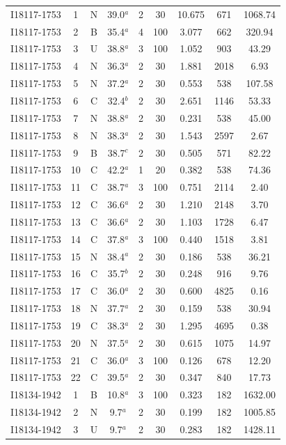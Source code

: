 \begin{table}
\begin{tabular}{ccccccccc}
I18117-1753 & 1 & N & 39.0$^{a}$ & 2 & 30 & 10.675 & 671 & 1068.74 \\
I18117-1753 & 2 & B & 35.4$^{a}$ & 4 & 100 & 3.077 & 662 & 320.94 \\
I18117-1753 & 3 & U & 38.8$^{a}$ & 3 & 100 & 1.052 & 903 & 43.29 \\
I18117-1753 & 4 & N & 36.3$^{a}$ & 2 & 30 & 1.881 & 2018 & 6.93 \\
I18117-1753 & 5 & N & 37.2$^{a}$ & 2 & 30 & 0.553 & 538 & 107.58 \\
I18117-1753 & 6 & C & 32.4$^{b}$ & 2 & 30 & 2.651 & 1146 & 53.33 \\
I18117-1753 & 7 & N & 38.8$^{a}$ & 2 & 30 & 0.231 & 538 & 45.00 \\
I18117-1753 & 8 & N & 38.3$^{a}$ & 2 & 30 & 1.543 & 2597 & 2.67 \\
I18117-1753 & 9 & B & 38.7$^{c}$ & 2 & 30 & 0.505 & 571 & 82.22 \\
I18117-1753 & 10 & C & 42.2$^{a}$ & 1 & 20 & 0.382 & 538 & 74.36 \\
I18117-1753 & 11 & C & 38.7$^{a}$ & 3 & 100 & 0.751 & 2114 & 2.40 \\
I18117-1753 & 12 & C & 36.6$^{a}$ & 2 & 30 & 1.210 & 2148 & 3.70 \\
I18117-1753 & 13 & C & 36.6$^{a}$ & 2 & 30 & 1.103 & 1728 & 6.47 \\
I18117-1753 & 14 & C & 37.8$^{a}$ & 3 & 100 & 0.440 & 1518 & 3.81 \\
I18117-1753 & 15 & N & 38.4$^{a}$ & 2 & 30 & 0.186 & 538 & 36.21 \\
I18117-1753 & 16 & C & 35.7$^{b}$ & 2 & 30 & 0.248 & 916 & 9.76 \\
I18117-1753 & 17 & C & 36.0$^{a}$ & 2 & 30 & 0.600 & 4825 & 0.16 \\
I18117-1753 & 18 & N & 37.7$^{a}$ & 2 & 30 & 0.159 & 538 & 30.94 \\
I18117-1753 & 19 & C & 38.3$^{a}$ & 2 & 30 & 1.295 & 4695 & 0.38 \\
I18117-1753 & 20 & N & 37.5$^{a}$ & 2 & 30 & 0.615 & 1075 & 14.97 \\
I18117-1753 & 21 & C & 36.0$^{a}$ & 3 & 100 & 0.126 & 678 & 12.20 \\
I18117-1753 & 22 & C & 39.5$^{a}$ & 2 & 30 & 0.347 & 840 & 17.73 \\
I18134-1942 & 1 & B & 10.8$^{a}$ & 3 & 100 & 0.323 & 182 & 1632.00 \\
I18134-1942 & 2 & N & 9.7$^{a}$ & 2 & 30 & 0.199 & 182 & 1005.85 \\
I18134-1942 & 3 & U & 9.7$^{a}$ & 2 & 30 & 0.283 & 182 & 1428.11 \\

\end{tabular}
\end{table}
